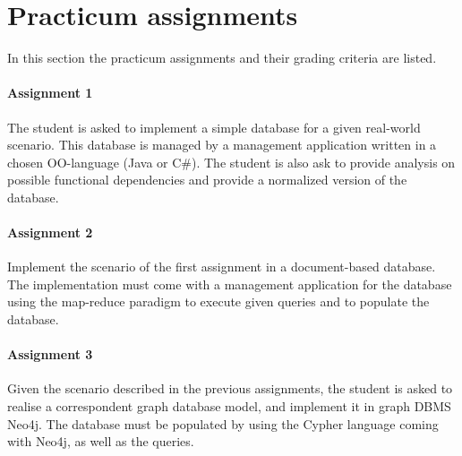 \section{Practicum assignments}
	In this section the practicum assignments and their grading criteria are listed.
	
	\paragraph*{Assignment 1}
		The student is asked to implement a simple database for a given real-world scenario. This database is managed by a management application written in a chosen OO-language (Java or C\#). The student is also ask to provide analysis on possible functional dependencies and provide a normalized version of the database.

	\paragraph*{Assignment 2}
		Implement the scenario of the first assignment in a document-based database. The implementation must come with a management application for the database using the map-reduce paradigm to execute given queries and to populate the database.

	\paragraph*{Assignment 3}
		Given the scenario described in the previous assignments, the student is asked to realise a correspondent graph database model, and implement it in graph DBMS Neo4j. The database must be populated by using the Cypher language coming with Neo4j, as well as the queries.

